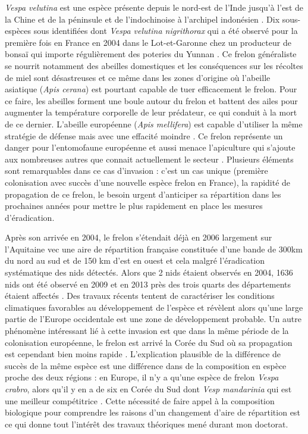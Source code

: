 \emph{Vespa velutina} est une espèce présente depuis le nord-est de
l'Inde jusqu'à l'est de la Chine et de la péninsule et de l'indochinoise
à l'archipel indonésien \citep{Villemant2006}. Dix sous-espèces sous
identifiées dont \emph{Vespa velutina nigrithorax} qui a été observé
pour la première fois en France en 2004 dans le Lot-et-Garonne chez un
producteur de bonsaï qui importe régulièrement des poteries du Yunnan
\citep{Villemant2006}. Ce frelon généraliste se nourrit notamment des
abeilles domestiques et les conséquences sur les récoltes de miel sont
désastreuses et ce même dans les zones d'origine où l'abeille asiatique
(\emph{Apis cerana}) est pourtant capable de tuer efficacement le
frelon. Pour ce faire, les abeilles forment une boule autour du frelon
et battent des ailes pour augmenter la température corporelle de leur
prédateur, ce qui conduit à la mort de ce dernier. L'abeille européenne
(\emph{Apis mellifera}) est capable d'utiliser la même stratégie de
défense mais avec une effacité moindre \citep{Villemant2006}. Ce frelon
représente un danger pour l'entomofaune européenne et aussi menace
l'apiculture qui s'ajoute aux nombreuses autres que connait actuellement
le secteur \citep{Vanbergen2013}. Plusieurs éléments sont remarquables
dans ce cas d'invasion : c'est un cas unique (première colonisation avec
succès d'une nouvelle espèce frelon en France), la rapidité de
propagation de ce frelon, le besoin urgent d'anticiper sa répartition
dans les prochaines années pour mettre le plus rapidement en place les
mesures d'éradication.

Après son arrivée en 2004, le frelon s'étendait déjà en 2006 largement
sur l'Aquitaine vec une aire de répartition française constituée d'une
bande de 300km du nord au sud et de 150 km d'est en ouest
\citep{Villemant2006} et cela malgré l'éradication systématique des nids
détectés. Alors que 2 nids étaient observés en 2004, 1636 nids ont été
observé en 2009 et en 2013 près des trois quarts des départements
étaient affectés \citep{Robinet2016}. Des travaux récents tentent de
caractériser les conditions climatiques favorables au développement de
l'espèce \citep{Villemant2011} et révèlent alors qu'une large partie de
l'Europe occidentale est une zone de développement probable. Un autre
phénomène intéressant lié à cette invasion est que dans la même période
de la colonisation européenne, le frelon est arrivé la Corée du Sud où
sa propagation est cependant bien moins rapide \citep{Villemant2011}.
L'explication plausible de la différence de succès de la même espèce est
une différence dans de la composition en espèce proche des deux régions
: en Europe, il n'y a qu'une espèce de frelon \emph{Vespa crabro}, alors
qu'il y en a de six en Corée du Sud dont \emph{Vesp mandarinia} qui est
une meilleur compétitrice \citep{Villemant2011}. Cette nécessité de
faire appel à la composition biologique pour comprendre les raisons d'un
changement d'aire de répartition est ce qui donne tout l'intérêt des
travaux théoriques mené durant mon doctorat.

